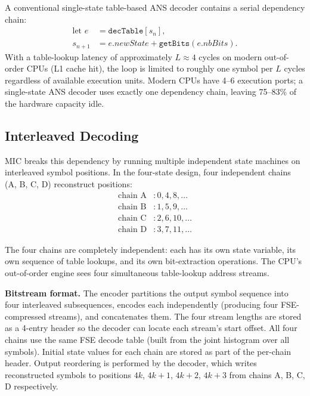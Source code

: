 \documentclass[journal]{IEEEtran}
\begin{document}
A conventional single-state table-based ANS decoder contains a serial
dependency chain:
\begin{equation}
\begin{aligned}
  \text{let } e &= \texttt{decTable}[s_n], \\
  s_{n+1} &= e.\textit{newState} + \texttt{getBits}(e.\textit{nbBits}).
\end{aligned}
\end{equation}
With a table-lookup latency of approximately $L \approx 4$ cycles on modern
out-of-order CPUs (L1 cache hit), the loop is limited to roughly one symbol per
$L$ cycles regardless of available execution units. Modern CPUs have 4--6
execution ports; a single-state ANS decoder uses exactly one dependency chain,
leaving 75--83\% of the hardware capacity idle.

\subsection{Interleaved Decoding}

MIC breaks this dependency by running multiple independent state machines on
interleaved symbol positions. In the four-state design, four independent chains
(A, B, C, D) reconstruct positions:
\begin{align*}
  \text{chain A}&: 0, 4, 8, \ldots \\
  \text{chain B}&: 1, 5, 9, \ldots \\
  \text{chain C}&: 2, 6, 10, \ldots \\
  \text{chain D}&: 3, 7, 11, \ldots
\end{align*}

The four chains are completely independent: each has its own state variable, its
own sequence of table lookups, and its own bit-extraction operations. The CPU's
out-of-order engine sees four simultaneous table-lookup address streams.

\textbf{Bitstream format.} The encoder partitions the output symbol sequence
into four interleaved subsequences, encodes each independently (producing four
FSE-compressed streams), and concatenates them. The four stream lengths are
stored as a 4-entry header so the decoder can locate each stream's start
offset. All four chains use the same FSE decode table (built from the joint
histogram over all symbols). Initial state values for each chain are stored as
part of the per-chain header. Output reordering is performed by the decoder,
which writes reconstructed symbols to positions $4k$, $4k+1$, $4k+2$, $4k+3$
from chains A, B, C, D respectively.
\end{document}
